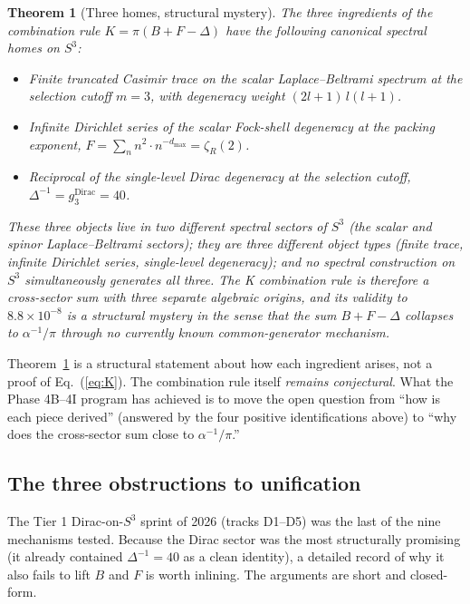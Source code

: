 \documentclass[aps,prl,twocolumn,superscriptaddress]{revtex4-2}
\newtheorem{theorem}{Theorem}
\begin{document}
\begin{theorem}[Three homes, structural mystery]\label{thm:three_homes}
The three ingredients of the combination rule $K = \pi(B + F - \Delta)$
have the following canonical spectral homes on $S^3$:
\begin{itemize}
  \item[$(B)$] Finite truncated Casimir trace on the scalar
    Laplace--Beltrami spectrum at the selection cutoff $m = 3$, with
    degeneracy weight $(2l+1)\,l(l+1)$.
  \item[$(F)$] Infinite Dirichlet series of the scalar Fock-shell
    degeneracy at the packing exponent,
    $F = \sum_{n} n^2 \cdot n^{-d_{\max}} = \zeta_R(2)$.
  \item[$(\Delta)$] Reciprocal of the single-level Dirac degeneracy at
    the selection cutoff, $\Delta^{-1} = g_3^{\text{Dirac}} = 40$.
\end{itemize}
These three objects live in two different spectral sectors of $S^3$ (the
scalar and spinor Laplace--Beltrami sectors); they are three different
object types (finite trace, infinite Dirichlet series, single-level
degeneracy); and no spectral construction on $S^3$ simultaneously
generates all three. The K combination rule is therefore a
\emph{cross-sector sum} with three separate algebraic origins, and its
validity to $8.8 \times 10^{-8}$ is a structural mystery in the sense
that the sum $B + F - \Delta$ collapses to $\alpha^{-1}/\pi$ through no
currently known common-generator mechanism.
\end{theorem}

Theorem~\ref{thm:three_homes} is a structural statement about how each
ingredient arises, not a proof of Eq.~(\ref{eq:K}). The combination
rule itself \emph{remains conjectural}. What the Phase 4B--4I program
has achieved is to move the open question from ``how is each piece
derived'' (answered by the four positive identifications above) to
``why does the cross-sector sum close to $\alpha^{-1}/\pi$.''

\subsection{The three obstructions to unification}\label{sec:obstructions}

The Tier 1 Dirac-on-$S^3$ sprint of 2026 (tracks D1--D5) was the last of
the nine mechanisms tested. Because the Dirac sector was the most
structurally promising (it already contained $\Delta^{-1} = 40$ as a
clean identity), a detailed record of why it also fails to lift $B$ and
$F$ is worth inlining. The arguments are short and closed-form.
\end{document}
